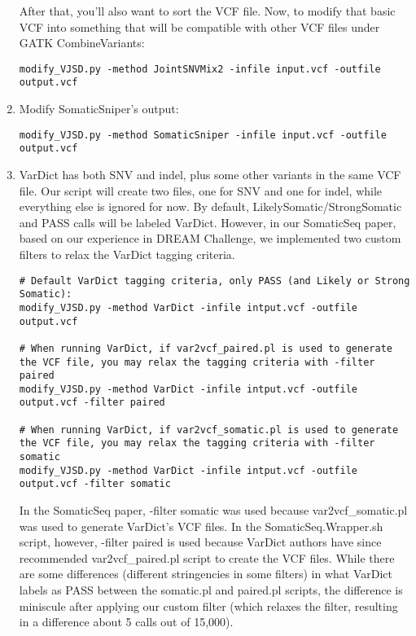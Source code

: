 \documentclass[10pt,letterpaper]{article}
\begin{document}
\begin{sloppypar}
\begin{enumerate}
After that, you'll also want to sort the VCF file. Now, to modify that basic VCF into something that will be compatible with other VCF files under GATK CombineVariants:
	
\begin{lstlisting}
modify_VJSD.py -method JointSNVMix2 -infile input.vcf -outfile output.vcf
\end{lstlisting}

\item	
Modify SomaticSniper's output:
	
\begin{lstlisting}
modify_VJSD.py -method SomaticSniper -infile input.vcf -outfile output.vcf
\end{lstlisting}
	
	
\item	
VarDict has both SNV and indel, plus some other variants in the same VCF file. Our script will create two files, one for SNV and one for indel, while everything else is ignored for now. By default, LikelySomatic/StrongSomatic and PASS calls will be labeled VarDict. However, in our SomaticSeq paper, based on our experience in DREAM Challenge, we implemented two custom filters to relax the VarDict tagging criteria. 
	
\begin{lstlisting}
# Default VarDict tagging criteria, only PASS (and Likely or Strong Somatic):
modify_VJSD.py -method VarDict -infile intput.vcf -outfile output.vcf
	
# When running VarDict, if var2vcf_paired.pl is used to generate the VCF file, you may relax the tagging criteria with -filter paired
modify_VJSD.py -method VarDict -infile intput.vcf -outfile output.vcf -filter paired
	
# When running VarDict, if var2vcf_somatic.pl is used to generate the VCF file, you may relax the tagging criteria with -filter somatic
modify_VJSD.py -method VarDict -infile intput.vcf -outfile output.vcf -filter somatic
\end{lstlisting}
	

In the SomaticSeq paper, -filter somatic was used because var2vcf\_somatic.pl was used to generate VarDict's VCF files. In the SomaticSeq.Wrapper.sh script, however, -filter paired is used because VarDict authors have since recommended var2vcf\_paired.pl script to create the VCF files. While there are some differences (different stringencies in some filters) in what VarDict labels as PASS between the somatic.pl and paired.pl scripts, the difference is miniscule after applying our custom filter (which relaxes the filter, resulting in a difference about 5 calls out of 15,000). 


\end{enumerate}
\end{sloppypar}
\end{document}

